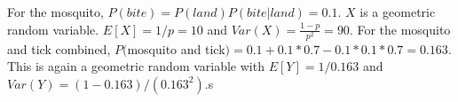 \documentclass[../../probability-notes.tex]{subfiles}
\begin{document}
        For the mosquito, $P(bite) =  P(land)P(bite|land) = 0.1$. $X$ is a geometric random variable. $E[X] = 1/p = 10$ and $Var(X) = \frac{1-p}{p^{2}} = 90$.\newline
        For the mosquito and tick combined, $P($mosquito and tick$) = 0.1 + 0.1*0.7 - 0.1*0.1*0.7 = 0.163$. This is again a geometric random variable with $E[Y] = 1/0.163$ and $Var(Y) = (1-0.163)/(0.163^{2})$.s
\end{document}
